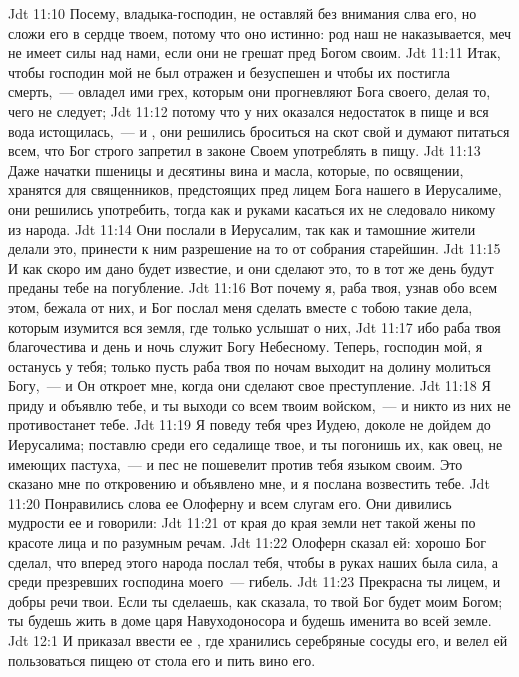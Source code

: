 \vs Jdt 11:10 Посему, владыка-господин, не оставляй без внимания слва его, но сложи его в сердце твоем, потому что оно истинно: род наш не наказывается, меч не имеет силы над нами, если они не грешат пред Богом своим.
\vs Jdt 11:11 Итак, чтобы господин мой не был отражен и безуспешен и чтобы их постигла смерть,~--- овладел ими грех, которым они прогневляют Бога своего, делая то, чего не следует;
\vs Jdt 11:12 потому что у них оказался недостаток в пище и вся вода истощилась,~--- и , они решились броситься на скот свой и думают питаться всем, что Бог строго запретил в законе Своем употреблять в пищу.
\vs Jdt 11:13 Даже начатки пшеницы и десятины вина и масла, которые, по освящении, хранятся для священников, предстоящих пред лицем Бога нашего в Иерусалиме, они решились употребить, тогда как и руками касаться их не следовало никому из народа.
\vs Jdt 11:14 Они послали в Иерусалим, так как и тамошние жители делали это, принести к ним разрешение на то от собрания старейшин.
\vs Jdt 11:15 И как скоро им дано будет известие, и они сделают это, то в тот же день будут преданы тебе на погубление.
\vs Jdt 11:16 Вот почему я, раба твоя, узнав обо всем этом, бежала от них, и Бог послал меня сделать вместе с тобою такие дела, которым изумится вся земля, где только услышат о них,
\vs Jdt 11:17 ибо раба твоя благочестива и день и ночь служит Богу Небесному. Теперь, господин мой, я останусь у тебя; только пусть раба твоя по ночам выходит на долину молиться Богу,~--- и Он откроет мне, когда они сделают свое преступление.
\vs Jdt 11:18 Я приду и объявлю тебе, и ты выходи  со всем твоим войском,~--- и никто из них не противостанет тебе.
\vs Jdt 11:19 Я поведу тебя чрез Иудею, доколе не дойдем до Иерусалима; поставлю среди его седалище твое, и ты погонишь их, как овец, не имеющих пастуха,~--- и пес не пошевелит против тебя языком своим. Это сказано мне по откровению и объявлено мне, и я послана возвестить тебе.
\vs Jdt 11:20 Понравились слова ее Олоферну и всем слугам его. Они дивились мудрости ее и говорили:
\vs Jdt 11:21 от края до края земли нет такой жены по красоте лица и по разумным речам.
\vs Jdt 11:22 Олоферн сказал ей: хорошо Бог сделал, что вперед этого народа послал тебя, чтобы в руках наших была сила, а среди презревших господина моего~--- гибель.
\vs Jdt 11:23 Прекрасна ты лицем, и добры речи твои. Если ты сделаешь, как сказала, то твой Бог будет моим Богом; ты будешь жить в доме царя Навуходоносора и будешь именита во всей земле.
\vs Jdt 12:1 И приказал ввести ее , где хранились серебряные сосуды его, и велел ей пользоваться пищею от стола его и пить вино его.
